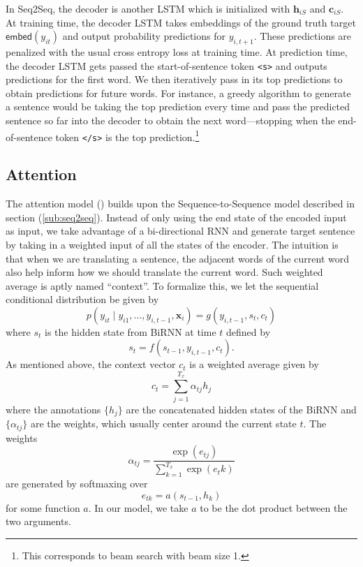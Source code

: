 \documentclass[12pt]{article}
\newcommand{\sts}{Seq2Seq}
\newcommand{\embed}{\mathsf{embed}}
\begin{document}
In \sts{}, the decoder is another LSTM which is initialized with $\bm h_{iS}$ and $\bm c_{iS}$. At training time, the decoder LSTM takes embeddings of the ground truth target $\embed(y_{it})$ and output probability predictions for $y_{i,t+1}$. These predictions are penalized with the usual cross entropy loss at training time. At prediction time, the decoder LSTM gets passed the start-of-sentence token \texttt{<s>} and outputs predictions for the first word. We then iteratively pass in its top predictions to obtain predictions for future words. For instance, a greedy algorithm to generate a sentence would be taking the top prediction every time and pass the predicted sentence so far into the decoder to obtain the next word---stopping when the end-of-sentence token \texttt{</s>} is the top prediction.\footnote{This corresponds to beam search with beam size 1.}  

\subsection{Attention}
\label{sub:attn}
The attention model (\cite{vaswani2017attention}) builds upon the Sequence-to-Sequence model described in section (\ref{sub:seq2seq}). Instead of only using the end state of the encoded input as input, we take advantage of a bi-directional RNN and generate target sentence by taking in a weighted input of all the states of the encoder. The intuition is that when we are translating a sentence, the adjacent words of the current word also help inform how we should translate the current word. Such weighted average is aptly named ``context''. To formalize this, we let the sequential conditional distribution be given by
\begin{equation}
	p(y_{it} \mid y_{i1}, \dots, y_{i,t-1}, \bm x_i) = g(y_{i,t-1}, s_t, c_t)
\end{equation}
where $s_t$ is the hidden state from BiRNN at time $t$ defined by
\begin{equation}
	s_t = f(s_{t-1}, y_{i,t-1}, c_t).
\end{equation}
As mentioned above, the context vector $c_t$ is a weighted average given by
\begin{equation}
	c_t = \sum_{j=1}^{T_x} \alpha_{tj} h_j
\end{equation}
where the annotations $\{h_j\}$ are the concatenated hidden states of the BiRNN and $\{\alpha_{tj}\}$ are the weights, which usually center around the current state $t$. The weights 
\begin{equation}
	\alpha_{tj} = \frac{\exp(e_{tj})}{\sum_{k=1}^{T_x} \exp(e_tk)}
\end{equation}
are generated by softmaxing over
\begin{equation}
	e_{tk} = a(s_{t-1}, h_k)
\end{equation}
for some function $a$. In our model, we take $a$ to be the dot product between the two arguments.
\end{document}
